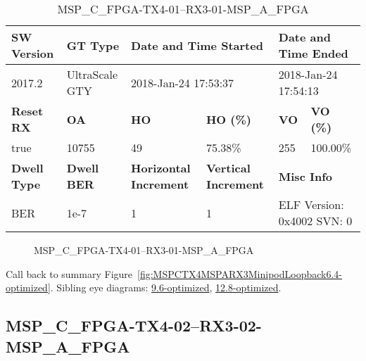 \begin{table}[h]
\centering
\caption{MSP\_C\_FPGA-TX4-01--RX3-01-MSP\_A\_FPGA}
\label{tab:MSPCFPGATX401RX301MSPAFPGA6.4-optimized}
\begin{tabular}{@{}|l|l|l|l|l|l|@{}}
\toprule
\textbf{SW Version}                & \textbf{GT Type}   & \multicolumn{2}{l|}{\textbf{Date and Time Started}}            & \multicolumn{2}{l|}{\textbf{Date and Time Ended}}        \\ \midrule
2017.2                       & UltraScale GTY          & \multicolumn{2}{l|}{2018-Jan-24 17:53:37}                   & \multicolumn{2}{l|}{2018-Jan-24 17:54:13}               \\ \midrule
\textbf{Reset RX}                  & \textbf{OA} & \textbf{HO}   & \textbf{HO (\%)} & \textbf{VO} & \textbf{VO (\%)} \\ \midrule
true & 10755        & 49          & 75.38\%        & 255        & 100.00\%       \\ \midrule
\textbf{Dwell Type}                & \textbf{Dwell BER} & \textbf{Horizontal Increment} & \textbf{Vertical Increment}    & \multicolumn{2}{l|}{\textbf{Misc Info}}                  \\ \midrule
BER                            & 1e-7        & 1        & 1           & \multicolumn{2}{l|}{ELF Version: 0x4002 SVN: 0}                         \\ \bottomrule
\end{tabular}
\end{table}

\begin{figure}[h]
\caption{MSP\_C\_FPGA-TX4-01--RX3-01-MSP\_A\_FPGA} \label{fig:MSPCFPGATX401RX301MSPAFPGA6.4-optimized}
\end{figure}

Call back to summary Figure~\ref{fig:MSPCTX4MSPARX3MinipodLoopback6.4-optimized}.
Sibling eye diagrams: \hyperref[sec:MSPCFPGATX401RX301MSPAFPGA9.6-optimized]{9.6-optimized}, \hyperref[sec:MSPCFPGATX401RX301MSPAFPGA12.8-optimized]{12.8-optimized}.

\clearpage
\newpage


\subsection{MSP\_C\_FPGA-TX4-02--RX3-02-MSP\_A\_FPGA}\label{sec:MSPCFPGATX402RX302MSPAFPGA6.4-optimized}

